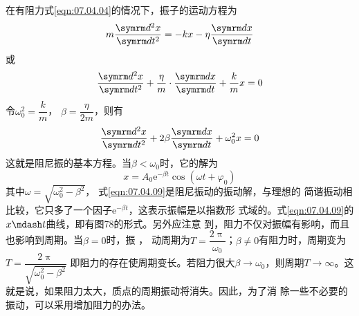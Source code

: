 在有阻力\lhbrak 式\eqref{eqn:07.04.04}\rhbrak 的情况下，振子的运动方程为
\begin{equation*}
    m \frac { \dif ^ { 2 } x } { \dif t ^ { 2 } } = - k x - \eta \frac { \dif x } { \dif t }
\end{equation*}
或
\begin{equation*}
    \frac { \dif ^ { 2 } x } { \dif t ^ { 2 } } + \frac { \eta } { m } \cdot \frac { \dif x } { \dif t } + \frac { k } { m } x = 0
\end{equation*}
令$ \omega _ 0 ^ { 2 } = \dfrac { k } { m }  $， $ \beta = \dfrac { \eta } { 2 m } $，则有
\begin{equation}\label{eqn:07.04.08}
    \frac { \dif ^ { 2 } x } { \dif t ^ { 2 } } + 2 \beta \frac { \dif x } { \dif t } + \omega _ { 0 } ^ { 2 } x = 0
\end{equation}
这就是阻尼振的基本方程。当$  \beta < \omega _ { 0 }   $时，它的解为
\begin{equation}\label{eqn:07.04.09}
    x = A _ { 0 } \mathrm{e} ^ { - \beta t } \cos ( \omega t + \varphi _ { 0 } )
\end{equation}
其中$\omega = \sqrt { \omega _ 0 ^ { 2 } - \beta ^ { 2 } } $， 式\eqref{eqn:07.04.09}是阻尼振动的振动解，与理想的
简谐振动相比较，它只多了一个因子$ \mathrm{e} ^ { - \beta t } $，这表示振幅是以指数形
式域的。式\eqref{eqn:07.04.09}的$ x \mdash t  $曲线，即有图78的形式。另外应注意
到，阻力不仅对振幅有影响，而且也影响到周期。当$  \beta = 0   $时，振
， \beta
动周期为$ T = \dfrac { 2 \uppi } { \omega _ { 0 } }  $；$  \beta \ne 0   $有阻力时，周期变为
$ T = \dfrac { 2 \uppi } { \sqrt { \omega _ { 0 } ^ { 2 } - \beta ^ { 2 } } } $
即阻力的存在使周期变长。若阻力很大$ \beta \to \omega _ { 0 } $，则周期$ T \to \infty $。这
就是说，如果阻力太大，质点的周期振动将消失。因此，为了消
除一些不必要的振动，可以采用增加阻力的办法。